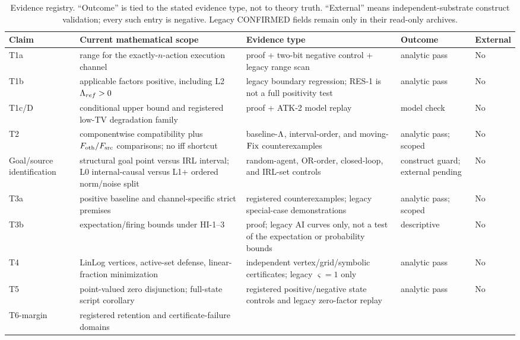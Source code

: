 \begin{table}[htbp]
\centering
\caption{Evidence registry. ``Outcome'' is tied to the stated evidence
type, not to theory truth. ``External'' means independent-substrate construct
validation; every such entry is negative. Legacy CONFIRMED fields remain only
in their read-only archives.}
\label{tab:main}
\scriptsize
\setlength{\tabcolsep}{3pt}
\begin{tabularx}{\textwidth}{@{}l >{\raggedright\arraybackslash}X
>{\raggedright\arraybackslash}X >{\raggedright\arraybackslash}p{} l@{}}
\toprule
Claim & Current mathematical scope & Evidence type & Outcome & External \\
\midrule
T1a & range for the exactly-$n$-action execution channel & proof + two-bit
negative control + legacy range scan & analytic pass & No \\
T1b & applicable factors positive, including L2 $\Lambda_{ref}>0$ &
legacy boundary regression; RES-1 is not a full positivity test & analytic pass & No \\
T1c/D & conditional upper bound and registered low-TV degradation family &
proof + ATK-2 model replay & model check & No \\
T2 & componentwise compatibility plus $F_{\mathrm{oth}}/F_{\mathrm{src}}$ comparisons; no iff shortcut &
baseline-$\Lambda$, interval-order, and moving-$\mathrm{Fix}$ counterexamples & analytic pass; scoped & No \\
Goal/source identification & structural goal point versus IRL interval; L0
internal-causal versus L1+ ordered norm/noise split & random-agent, OR-order,
closed-loop, and IRL-set controls & construct guard; external pending & No \\
T3a & positive baseline and channel-specific strict premises &
registered counterexamples; legacy special-case demonstrations & analytic pass; scoped & No \\
T3b & expectation/firing bounds under HI-1--3 & proof; legacy AI curves only,
not a test of the expectation or probability bounds & descriptive & No \\
T4 & LinLog vertices, active-set defense, linear-fraction minimization &
independent vertex/grid/symbolic certificates; legacy $\varsigma=1$ only & analytic pass & No \\
T5 & point-valued zero disjunction; full-state script corollary &
registered positive/negative state controls and legacy zero-factor replay & analytic pass & No \\
T6-margin & registered retention and certificate-failure domains &

\end{tabularx}
\end{table}
